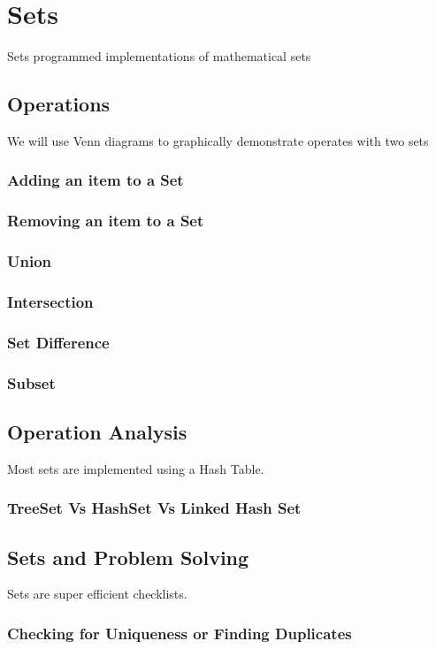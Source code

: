 \chapter{Sets}
\label{chap-sets}
Sets programmed  implementations of mathematical sets




\section{Operations}

We will use Venn diagrams to graphically  demonstrate operates with two sets
\subsection{Adding an item to a Set}

\subsection{Removing an item to a Set}


\subsection{Union}

\subsection{Intersection}


\subsection{Set Difference}

\subsection{Subset}

\section{Operation Analysis}

Most sets are implemented using a Hash Table.

\subsection{TreeSet Vs HashSet Vs Linked Hash Set}

\section{Sets and Problem Solving}

Sets are super efficient checklists.

\subsection{Checking for Uniqueness or Finding Duplicates}

